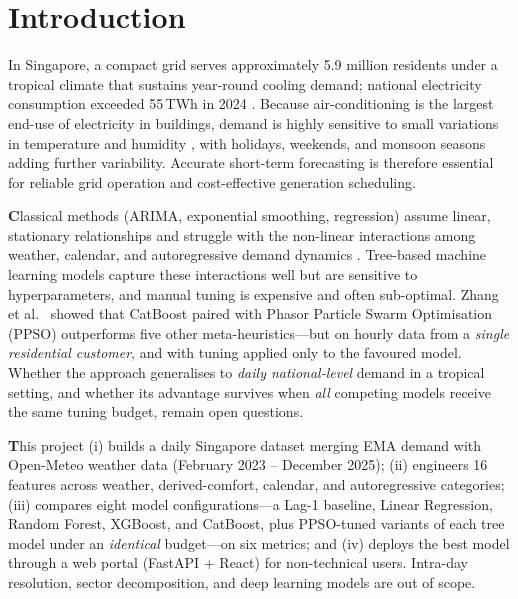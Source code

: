 \section{Introduction}\label{sec:intro}
 \setcounter{page}{1}

In Singapore, a compact grid serves approximately 5.9 million residents under a tropical climate that sustains year-round cooling demand; national electricity consumption exceeded 55\,TWh in 2024 \parencite{ema2025statistics}. Because air-conditioning is the largest end-use of electricity in buildings, demand is highly sensitive to small variations in temperature and humidity \parencite{zhao2012review}, with holidays, weekends, and monsoon seasons adding further variability. Accurate short-term forecasting is therefore essential for reliable grid operation and cost-effective generation scheduling.

\textbf Classical methods (ARIMA, exponential smoothing, regression) assume linear, stationary relationships and struggle with the non-linear interactions among weather, calendar, and autoregressive demand dynamics \parencite{almusaylh2018forecasting}. Tree-based machine learning models capture these interactions well but are sensitive to hyperparameters, and manual tuning is expensive and often sub-optimal. Zhang et al.\ \parencite{zhang2023catboostppso} showed that CatBoost paired with Phasor Particle Swarm Optimisation (PPSO) outperforms five other meta-heuristics---but on hourly data from a \emph{single residential customer}, and with tuning applied only to the favoured model. Whether the approach generalises to \emph{daily national-level} demand in a tropical setting, and whether its advantage survives when \emph{all} competing models receive the same tuning budget, remain open questions.

\textbf This project (i) builds a daily Singapore dataset merging EMA demand with Open-Meteo weather data (February 2023 -- December 2025); (ii) engineers 16 features across weather, derived-comfort, calendar, and autoregressive categories; (iii) compares eight model configurations---a Lag-1 baseline, Linear Regression, Random Forest, XGBoost, and CatBoost, plus PPSO-tuned variants of each tree model under an \emph{identical} budget---on six metrics; and (iv) deploys the best model through a web portal (FastAPI + React) for non-technical users. Intra-day resolution, sector decomposition, and deep learning models are out of scope.
